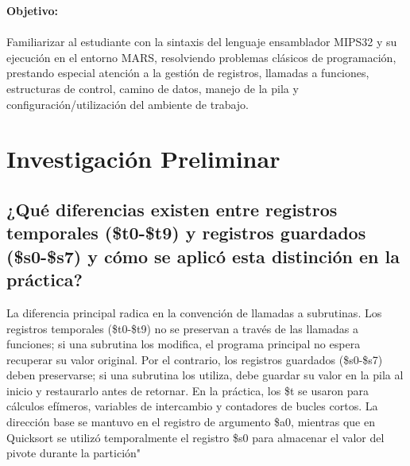 \documentclass[12pt, a4paper]{article}
\begin{document}

\newpage

\textbf{\large Objetivo:}\\\\
    Familiarizar al estudiante con la sintaxis del lenguaje ensamblador MIPS32 y su ejecución en el entorno MARS, resolviendo problemas clásicos de programación, prestando especial atención a la gestión de registros, llamadas a funciones, estructuras de control, camino de datos, manejo de la pila y configuración/utilización del ambiente de trabajo.\\

\section{Investigación Preliminar}

\subsection{¿Qué diferencias existen entre registros temporales (\$t0-\$t9) y registros guardados (\$s0-\$s7) y cómo se aplicó esta distinción en la práctica?}
    La diferencia principal radica en la convención de llamadas a subrutinas. Los registros temporales (\$t0-\$t9) no se preservan a través de las llamadas a funciones; si una subrutina los modifica, el programa principal no espera recuperar su valor original. Por el contrario, los registros guardados (\$s0-\$s7) deben preservarse; si una subrutina los utiliza, debe guardar su valor en la pila al inicio y restaurarlo antes de retornar. En la práctica, los \$t se usaron para cálculos efímeros, variables de intercambio y contadores de bucles cortos. La dirección base se mantuvo en el registro de argumento \$a0, mientras que en Quicksort se utilizó temporalmente el registro \$s0 para almacenar el valor del pivote durante la partición"
\end{document}
